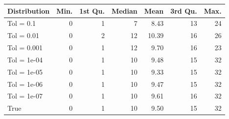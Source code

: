 \begin{figure} 
\begin{tabular}{lrrrrrr}
 Distribution & Min. & 1st Qu. & Median & Mean & 3rd Qu. & Max. \\ 
  \hline
\hline
Tol =  0.1 & 0 & 1 & 7 & 8.43 & 13 & 24 \\ 
  Tol =  0.01 & 0 & 2 & 12 & 10.39 & 16 & 26 \\ 
  Tol =  0.001 & 0 & 1 & 12 & 9.70 & 16 & 23 \\ 
  Tol =  1e-04 & 0 & 1 & 10 & 9.48 & 15 & 32 \\ 
  Tol =  1e-05 & 0 & 1 & 10 & 9.33 & 15 & 32 \\ 
  Tol =  1e-06 & 0 & 1 & 10 & 9.47 & 15 & 32 \\ 
  Tol =  1e-07 & 0 & 1 & 10 & 9.61 & 16 & 32 \\ 
  True & 0 & 1 & 10 & 9.50 & 15 & 32 \\ 
  \end{tabular}
\label{tab:SummaryTable}
\end{figure} 
